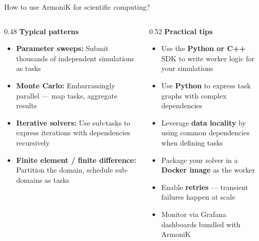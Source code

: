 \begin{frame}{How to use ArmoniK for scientific computing?}
	\begin{columns}[T]
		\begin{column}{0.48\textwidth}
			\textbf{Typical patterns}
			\begin{itemize}
				\item \textbf{Parameter sweeps:} Submit thousands of independent simulations as tasks
				\item \textbf{Monte Carlo:} Embarrassingly parallel — map tasks, aggregate results
				\item \textbf{Iterative solvers:} Use sub-tasks to express iterations with dependencies recursively
				\item \textbf{Finite element / finite difference:} Partition the domain, schedule sub-domains as tasks
			\end{itemize}
		\end{column}
		\begin{column}{0.52\textwidth}
			\textbf{Practical tips}
			\begin{itemize}
				\item Use the \textbf{Python or C++} SDK to write worker logic for your simulations
				\item Use \textbf{Python} to express task graphs with complex dependencies
				\item Leverage \textbf{data locality} by using common dependencies when defining tasks
				\item Package your solver in a \textbf{Docker image} as the worker
				\item Enable \textbf{retries} — transient failures happen at scale
				\item Monitor via Grafana dashboards bundled with ArmoniK
			\end{itemize}
		\end{column}
	\end{columns}
\end{frame}

